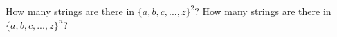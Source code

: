   How many strings are there in
  $\{a,b,c,...,z\}^2$?
  How many strings are there in
  $\{a,b,c,...,z\}^n$?
